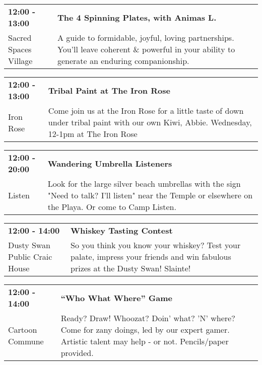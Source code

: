 \begin{tabular}{ p{1in} p{2.2in} }
    \textbf{12:00 - 13:00} & \textbf{The 4 Spinning Plates, with Animas L.} \\
    Sacred Spaces Village \newline  & A guide to formidable, joyful, loving partnerships. You'll leave coherent \& powerful in your ability to generate an enduring companionship. \\
    \hline 
\end{tabular}
    
\begin{tabular}{ p{1in} p{2.2in} }
    \textbf{12:00 - 13:00} & \textbf{Tribal Paint at The Iron Rose} \\
    Iron Rose \newline  & Come join us at the Iron Rose for a little taste of down under tribal paint with our own Kiwi, Abbie. Wednesday, 12-1pm at The Iron Rose \\
    \hline 
\end{tabular}
    
\begin{tabular}{ p{1in} p{2.2in} }
    \textbf{12:00 - 20:00} & \textbf{Wandering Umbrella Listeners} \\
    Listen \newline  & Look for the large silver beach umbrellas with the sign "Need to talk? I'll listen" near the Temple or elsewhere on the Playa. Or come to Camp Listen. \\
    \hline 
\end{tabular}
    
\begin{tabular}{ p{1in} p{2.2in} }
    \textbf{12:00 - 14:00} & \textbf{Whiskey Tasting Contest} \\
    Dusty Swan Public Craic House \newline  & So you think you know your whiskey? Test your palate, impress your friends and win fabulous prizes at the Dusty Swan! Slainte! \\
    \hline 
\end{tabular}
    
\begin{tabular}{ p{1in} p{2.2in} }
    \textbf{12:00 - 14:00} & \textbf{``Who What Where'' Game} \\
    Cartoon Commune \newline  & Ready? Draw! Whoozat? Doin' what? 'N' where? Come for zany doings, led by our expert gamer. Artistic talent may help - or not. Pencils/paper provided. \\
    \hline 
\end{tabular}
    
